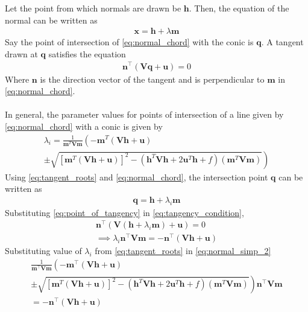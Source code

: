 \documentclass[journal,10pt,twocolumn]{article}
\let\vec\mathbf
\providecommand{\brak}[1]{\ensuremath{\left(#1\right)}}
\providecommand{\lbrak}[1]{\ensuremath{\left(#1\right.}}
\providecommand{\rbrak}[1]{\ensuremath{\left.#1\right)}}
\providecommand{\sbrak}[1]{\ensuremath{{}\left[#1\right]}}
\begin{document}
Let the point from which normals are drawn be $\vec{h}$. Then, the equation of the normal can be written as
\begin{align}
	\vec{x} = \vec{h} + \lambda\vec{m}
	\label{eq:normal_chord}
\end{align}
Say the point of intersection of \eqref{eq:normal_chord} with the conic is $\vec{q}$. A tangent drawn at $\vec{q}$ satisfies the equation
\begin{align}
	\label{eq:tangency_condition}
	\vec{n}^\top(\vec{Vq}+\vec{u}) = 0
\end{align}
Where $\vec{n}$ is the direction vector of the tangent and is perpendicular to $\vec{m}$ in \eqref{eq:normal_chord}.\\\\
In general, the parameter values for points of intersection of a line given by \eqref{eq:normal_chord} with a conic is given by
{\tiny
\begin{multline}
\lambda_i = \frac{1}
{
\vec{m}^T\vec{V}\vec{m}
}
\lbrak{-\vec{m}^T\brak{\vec{V}\vec{h}+\vec{u}}}
\\
\pm
\rbrak{\sqrt{
\sbrak{
\vec{m}^T\brak{\vec{V}\vec{h}+\vec{u}}
}^2
-
\brak
{
\vec{h}^T\vec{V}\vec{h} + 2\vec{u}^T\vec{h} +f
}
\brak{\vec{m}^T\vec{V}\vec{m}}
}
}
\label{eq:tangent_roots}
\end{multline}
}
Using \eqref{eq:tangent_roots} and \eqref{eq:normal_chord}, the intersection point $\vec{q}$ can be written as
\begin{align}
	\label{eq:point_of_tangency}
	\vec{q} = \vec{h} + \lambda_i\vec{m}
\end{align}
Substituting \eqref{eq:point_of_tangency} in \eqref{eq:tangency_condition},
\begin{align}
	\label{eq:normal_simp_1}
	\vec{n}^\top(\vec{V}(\vec{h}+\lambda_i\vec{m})+\vec{u}) = 0\\
	\label{eq:normal_simp_2}
	\implies \lambda_i\vec{n}^\top\vec{V}\vec{m} = -\vec{n}^\top(\vec{Vh}+\vec{u})
\end{align}
Substituting value of $\lambda_i$ from \eqref{eq:tangent_roots} in \eqref{eq:normal_simp_2}
{\tiny
\begin{multline}
	\frac{1}{\vec{m}^\top\vec{V}\vec{m}}\lbrak{-\vec{m}^\top\brak{\vec{Vh}+\vec{u}}} \\ 
	\pm \rbrak{\sqrt{\sbrak{\vec{m}^T\brak{\vec{V}\vec{h}+\vec{u}}}^2-\brak{\vec{h}^T\vec{V}\vec{h} + 2\vec{u}^T\vec{h} +f}\brak{\vec{m}^T\vec{V}\vec{m}}}}\vec{n}^\top\vec{V}\vec{m} \\
	= -\vec{n}^\top\brak{\vec{Vh}+\vec{u}}
	\label{eq:normal_simp_3}
\end{multline}
}
\end{document}
